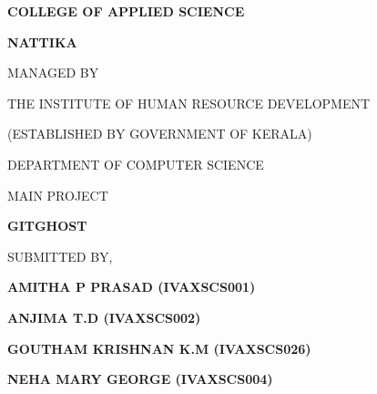 \documentclass[12pt, a4paper, oneside]{report}
\begin{document}
\begin{singlespacing}
\begin{center}
    {\Large \textbf{COLLEGE OF APPLIED SCIENCE} \par}
    \vspace{0.2cm}
    {\Large \textbf{NATTIKA} \par}
    
    \vspace{1cm}
    {\normalsize MANAGED BY \par}
    \vspace{0.2cm}
    {\normalsize THE INSTITUTE OF HUMAN RESOURCE DEVELOPMENT \par}
    \vspace{0.2cm}
    {\normalsize (ESTABLISHED BY GOVERNMENT OF KERALA) \par}
    
    \vspace{0.5cm}
    \begin{figure}[H]
        \centering
    \end{figure}
    
    \vspace{0.5cm}
    {\large \textnormal{DEPARTMENT OF COMPUTER SCIENCE} \par}
    \vspace{0.4cm}
    {\large \textnormal{MAIN PROJECT} \par}
    \vspace{0.4cm}
    {\large \textbf{GITGHOST} \par}
    
    \vspace{1cm}
    {\normalsize \textnormal{SUBMITTED BY,} \par}
    \vspace{0.5cm}
    {\large \textbf{AMITHA P PRASAD (IVAXSCS001)} \par}
    \vspace{0.4cm}
    {\large \textbf{ANJIMA T.D (IVAXSCS002)} \par}
    \vspace{0.4cm}
    {\large \textbf{GOUTHAM KRISHNAN K.M (IVAXSCS026)} \par}
    \vspace{0.4cm}
    {\large \textbf{NEHA MARY GEORGE (IVAXSCS004)} \par}
\end{center}
\end{singlespacing}
\newpage
\end{document}
